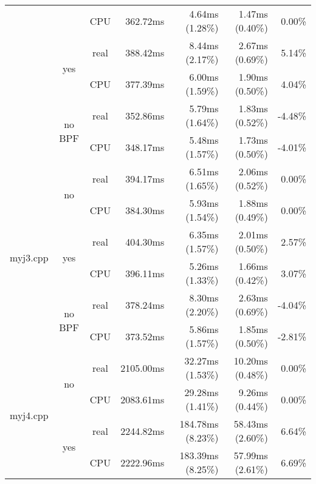 \documentclass[en]{pracamgr}
\begin{document}
\begin{appendices}
\begin{small}
\begin{longtable}{|l|c|c|r|r|r|r|}
                            &                         & CPU  & 362.72ms & 4.64ms (1.28\%) & 1.47ms (0.40\%) & 0.00\% \\*
                            \cline{2-7}
                            & \multirow{2}{*}{yes}    & real & 388.42ms & 8.44ms (2.17\%) & 2.67ms (0.69\%) & 5.14\% \\*
                            &                         & CPU  & 377.39ms & 6.00ms (1.59\%) & 1.90ms (0.50\%) & 4.04\% \\*
                            \cline{2-7}
                            & \multirow{2}{*}{no BPF} & real & 352.86ms & 5.79ms (1.64\%) & 1.83ms (0.52\%) & -4.48\% \\*
                            &                         & CPU  & 348.17ms & 5.48ms (1.57\%) & 1.73ms (0.50\%) & -4.01\% \\
\hline
\multirow{6}{*}{myj3.cpp}   & \multirow{2}{*}{no}     & real & 394.17ms & 6.51ms (1.65\%) & 2.06ms (0.52\%) & 0.00\% \\*
                            &                         & CPU  & 384.30ms & 5.93ms (1.54\%) & 1.88ms (0.49\%) & 0.00\% \\*
                            \cline{2-7}
                            & \multirow{2}{*}{yes}    & real & 404.30ms & 6.35ms (1.57\%) & 2.01ms (0.50\%) & 2.57\% \\*
                            &                         & CPU  & 396.11ms & 5.26ms (1.33\%) & 1.66ms (0.42\%) & 3.07\% \\*
                            \cline{2-7}
                            & \multirow{2}{*}{no BPF} & real & 378.24ms & 8.30ms (2.20\%) & 2.63ms (0.69\%) & -4.04\% \\*
                            &                         & CPU  & 373.52ms & 5.86ms (1.57\%) & 1.85ms (0.50\%) & -2.81\% \\
\hline
\multirow{6}{*}{myj4.cpp}   & \multirow{2}{*}{no}     & real & 2105.00ms & 32.27ms (1.53\%) & 10.20ms (0.48\%) & 0.00\% \\*
                            &                         & CPU  & 2083.61ms & 29.28ms (1.41\%) & 9.26ms (0.44\%) & 0.00\% \\*
                            \cline{2-7}
                            & \multirow{2}{*}{yes}    & real & 2244.82ms & 184.78ms (8.23\%) & 58.43ms (2.60\%) & 6.64\% \\*
                            &                         & CPU  & 2222.96ms & 183.39ms (8.25\%) & 57.99ms (2.61\%) & 6.69\% \\*

\end{longtable}
\end{small}
\end{appendices}
\end{document}
